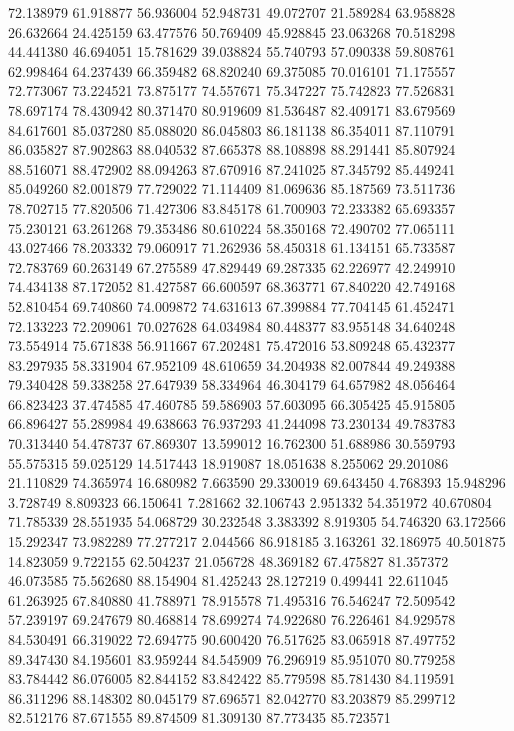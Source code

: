 72.138979
61.918877
56.936004
52.948731
49.072707
21.589284
63.958828
26.632664
24.425159
63.477576
50.769409
45.928845
23.063268
70.518298
44.441380
46.694051
15.781629
39.038824
55.740793
57.090338
59.808761
62.998464
64.237439
66.359482
68.820240
69.375085
70.016101
71.175557
72.773067
73.224521
73.875177
74.557671
75.347227
75.742823
77.526831
78.697174
78.430942
80.371470
80.919609
81.536487
82.409171
83.679569
84.617601
85.037280
85.088020
86.045803
86.181138
86.354011
87.110791
86.035827
87.902863
88.040532
87.665378
88.108898
88.291441
85.807924
88.516071
88.472902
88.094263
87.670916
87.241025
87.345792
85.449241
85.049260
82.001879
77.729022
71.114409
81.069636
85.187569
73.511736
78.702715
77.820506
71.427306
83.845178
61.700903
72.233382
65.693357
75.230121
63.261268
79.353486
80.610224
58.350168
72.490702
77.065111
43.027466
78.203332
79.060917
71.262936
58.450318
61.134151
65.733587
72.783769
60.263149
67.275589
47.829449
69.287335
62.226977
42.249910
74.434138
87.172052
81.427587
66.600597
68.363771
67.840220
42.749168
52.810454
69.740860
74.009872
74.631613
67.399884
77.704145
61.452471
72.133223
72.209061
70.027628
64.034984
80.448377
83.955148
34.640248
73.554914
75.671838
56.911667
67.202481
75.472016
53.809248
65.432377
83.297935
58.331904
67.952109
48.610659
34.204938
82.007844
49.249388
79.340428
59.338258
27.647939
58.334964
46.304179
64.657982
48.056464
66.823423
37.474585
47.460785
59.586903
57.603095
66.305425
45.915805
66.896427
55.289984
49.638663
76.937293
41.244098
73.230134
49.783783
70.313440
54.478737
67.869307
13.599012
16.762300
51.688986
30.559793
55.575315
59.025129
14.517443
18.919087
18.051638
8.255062
29.201086
21.110829
74.365974
16.680982
7.663590
29.330019
69.643450
4.768393
15.948296
3.728749
8.809323
66.150641
7.281662
32.106743
2.951332
54.351972
40.670804
71.785339
28.551935
54.068729
30.232548
3.383392
8.919305
54.746320
63.172566
15.292347
73.982289
77.277217
2.044566
86.918185
3.163261
32.186975
40.501875
14.823059
9.722155
62.504237
21.056728
48.369182
67.475827
81.357372
46.073585
75.562680
88.154904
81.425243
28.127219
0.499441
22.611045
61.263925
67.840880
41.788971
78.915578
71.495316
76.546247
72.509542
57.239197
69.247679
80.468814
78.699274
74.922680
76.226461
84.929578
84.530491
66.319022
72.694775
90.600420
76.517625
83.065918
87.497752
89.347430
84.195601
83.959244
84.545909
76.296919
85.951070
80.779258
83.784442
86.076005
82.844152
83.842422
85.779598
85.781430
84.119591
86.311296
88.148302
80.045179
87.696571
82.042770
83.203879
85.299712
82.512176
87.671555
89.874509
81.309130
87.773435
85.723571
